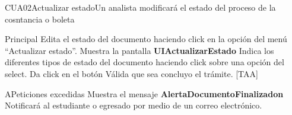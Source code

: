 \begin{UseCase}{CUA02}{Actualizar estado}{Un analista modificará el estado del proceso de la cosntancia o boleta}
{\begin{itemize}
		\end{itemize}
  }
\end{UseCase}

\begin{UCtrayectoria}{Principal}
  \UCpaso[\UCactor] Edita el estado del documento  haciendo click en la opción del menú ``Actualizar estado”.
  \UCpaso Muestra la pantalla  {\bf UIActualizarEstado}
  \UCpaso[\UCactor] Indica los diferentes  tipos de estado del documento haciendo click sobre una opción del select.
  \UCpaso[\UCactor] Da click en el botón 
  \UCpaso  Válida que sea concluyo el trámite. [TAA] 
\end{UCtrayectoria} 

\begin{UCtrayectoriaA}{A}{Peticiones excedidas} 
\UCpaso Muestra el mensaje {\bf AlertaDocumentoFinalizadon}
  \UCpaso Notificará al estudiante o egresado por medio de un correo electrónico. 	
\end{UCtrayectoriaA}
